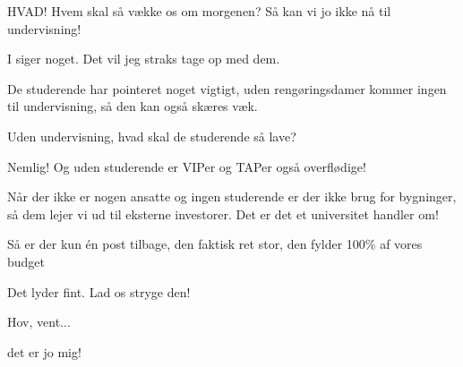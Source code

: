 \documentclass[a4paper,11pt]{article}
\begin{document}
\begin{sketch}
     HVAD! Hvem skal så vække os om morgenen?  Så kan vi jo
    ikke nå til undervisning!

     I siger noget. Det vil jeg straks tage op med dem.


     De studerende har pointeret noget vigtigt, uden
    rengøringsdamer kommer ingen til undervisning, så den kan også
    skæres væk.

     Uden undervisning, hvad skal de studerende så lave?

     Nemlig!  Og uden studerende er VIPer og TAPer også
    overflødige!

     Når der ikke er nogen ansatte og ingen studerende er der
    ikke brug for bygninger, så dem lejer vi ud til eksterne investorer.
    Det er det et universitet handler om!

     Så er der kun \'{e}n post tilbage, den faktisk ret stor,
    den fylder 100\% af vores budget

      Det lyder fint. Lad os stryge den!

     Hov, vent...  

     det er jo mig!

  \end{sketch}
\end{document}
